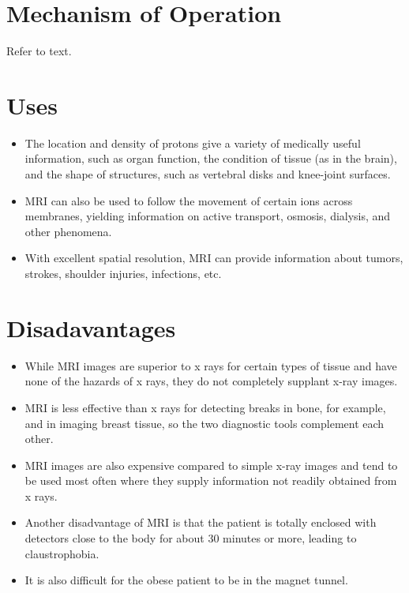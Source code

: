 \documentclass[12pt]{book}
\begin{document}
\section{Mechanism of Operation}
Refer to text.

\section{Uses}
\begin{itemize}
\item The location and density of protons give a variety of medically useful information, such as organ function, the condition of tissue (as in the brain), and the shape of structures, such as vertebral disks and knee-joint surfaces.
\item MRI can also be used to follow the movement of certain ions across membranes, yielding information on active transport, osmosis, dialysis, and other phenomena.
\item With excellent spatial resolution, MRI can provide information about tumors, strokes, shoulder injuries, infections, etc.
\end{itemize}
\section{Disadavantages}
\begin{itemize}
\item While MRI images are superior to x rays for certain types of tissue and have none of the hazards of x rays, they do not completely supplant x-ray images.

\item MRI is less effective than x rays for detecting breaks in bone, for example, and in imaging breast tissue, so the two diagnostic tools complement each other.
\item MRI images are also expensive compared to simple x-ray images and tend to be used most often where they supply information not readily obtained from x rays.

\item Another disadvantage of MRI is that the patient is totally enclosed with detectors close to the body for about 30 minutes or more, leading to claustrophobia.
\item It is also difficult for the obese patient to be in the magnet tunnel.

\end{itemize}
\end{document}
